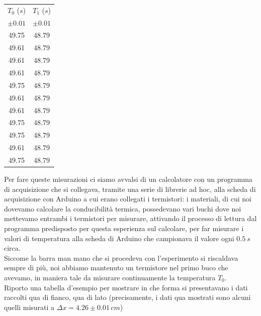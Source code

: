 \documentclass{article}
\begin{document}
\begin{table}
\centering
\begin{tabular}{c c} \toprule
$T_0$ ($s$) & $T_1$ ($s$) \\
$\pm 0.01$ & $\pm 0.01$ \\ \toprule
49.75 &	48.79 \\ \midrule
49.61 &	48.79 \\ \midrule
49.61 &	48.79 \\ \midrule
49.61 &	48.79 \\ \midrule
49.75 &	48.79 \\ \midrule
49.61 &	48.79 \\ \midrule
49.61 &	48.79 \\ \midrule
49.75 &	48.79 \\ \midrule
49.75 &	48.79 \\ \midrule
49.61 &	48.79 \\ \midrule
49.75 &	48.79 \\ \bottomrule
\end{tabular}
\end{table}

\noindent Per fare queste misurazioni ci siamo avvalsi di un calcolatore con un programma di acquisizione che si collegava, tramite una serie di librerie ad hoc, alla scheda di acquisizione con Arduino a cui erano collegati i termistori: i materiali, di cui noi dovevamo calcolare la conducibilità termica, possedevano vari buchi dove noi mettevamo entrambi  i termistori per misurare, attivando il processo di lettura dal programma predisposto per questa esperienza sul calcolare, per far misurare i valori di temperatura alla scheda di Arduino che campionava il valore ogni $0.5 \ s$ circa. \\
Siccome la barra man mano che si procedeva con l'esperimento si riscaldava sempre di più, noi abbiamo mantenuto un termistore nel primo buco che avevamo, in maniera tale da misurare continuamente la temperatura $T_0$. \\
Riporto una tabella d'esempio per mostrare in che forma si presentavano i dati raccolti qua di fianco, qua di lato (precisamente, i dati qua mostrati sono alcuni quelli misurati a $\Delta x = 4.26 \pm 0.01 \, \unit{cm}$)
\end{document}
